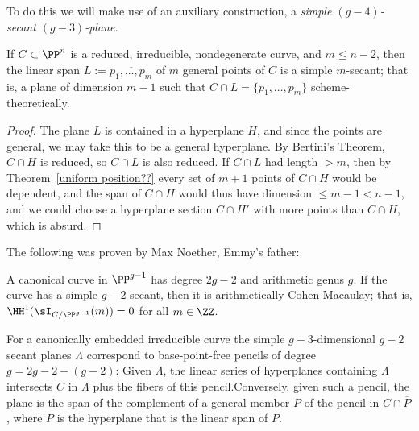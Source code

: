 To do this we will make use of an auxiliary construction, a \emph{simple $(g-4)$-secant $(g-3)$-plane.}

\begin{lemma}
 If $C\subset \PP^n$ is a reduced, irreducible, nondegenerate curve, and $m\leq n-2$, then the linear span $L := \overline{p_1,\dots, p_m}$
 of $m$ general points of $C$ is a simple $m$-secant; that is, a plane of dimension $m-1$ such that
 $C\cap L = \{p_1,\dots,p_m\}$ scheme-theoretically.
 \end{lemma}
 
 
\begin{proof}
The plane $L$ is contained in a hyperplane $H$, and since the points are general, we may take this to be a general hyperplane. By Bertini's Theorem, $C\cap H$ is reduced, so $C\cap L$ is also reduced.
 If $C\cap L$ had length $>m$, then by Theorem~\ref{uniform position??} every set of $m+1$ points of $C\cap H$ would be dependent,
 and the span of $C\cap H$ would thus have dimension $\leq m-1<n-1$, and we could choose a hyperplane section $C\cap H'$ with more points than $C\cap H$, which is absurd.
\end{proof}

The following was proven by Max Noether, Emmy's father:

\begin{theorem}\label{canonical curves are ACM}
A canonical curve in $\PP^{g-1}$ has degree $2g-2$ and arithmetic genus $g$. If the curve has a simple
$g-2$ secant, then it is arithmetically Cohen-Macaulay; that is,
$\HH^{1}(\sI_{C/\PP^{g-1}}(m)) = 0$ for all $m\in \ZZ$.
\end{theorem}
 
For a canonically embedded irreducible curve the simple $g-3$-dimensional $g-2$ secant planes $\Lambda$  correspond to base-point-free pencils of degree $g = 2g-2 -(g-2)$: Given $\Lambda$, the linear series of hyperplanes containing $\Lambda$ intersects $C$ in $\Lambda$ plus the fibers of this pencil.Conversely, given such a pencil, the plane is the span of the complement of a general  member $P$ of the pencil in  $C\cap \overline P$, where $\overline P$ is the hyperplane that is the linear span of $P$.
  
